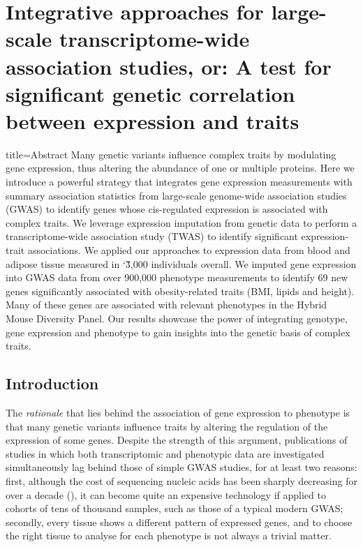 \documentclass[../main.tex]{subfiles}
\begin{document}
\chapter{Integrative approaches for large-scale transcriptome-wide 
association studies, or: A test for significant \cis genetic correlation 
between expression and traits}

\begin{external_abstract}{title=Abstract}
Many genetic variants influence complex traits by modulating gene 
expression, thus altering the abundance of one or multiple proteins. 
Here we introduce a powerful strategy that integrates gene expression 
measurements with summary association statistics from large-scale 
genome-wide association studies (GWAS) to identify genes whose 
cis-regulated expression is associated with complex traits. We leverage 
expression imputation from genetic data to perform a transcriptome-wide 
association study (TWAS) to identify significant expression-trait 
associations. We applied our approaches to expression data from blood 
and adipose tissue measured in \char`\~3,000 individuals overall. We 
imputed gene expression into GWAS data from over 900,000 phenotype 
measurements to identify 69 new genes significantly associated with 
obesity-related traits (BMI, lipids and height). Many of these genes are 
associated with relevant phenotypes in the Hybrid Mouse Diversity Panel. 
Our results showcase the power of integrating genotype, gene expression 
and phenotype to gain insights into the genetic basis of complex traits.
\end{external_abstract}

\section{Introduction}

The \textit{rationale} that lies behind the association of gene 
expression to phenotype is that many genetic variants influence traits 
by altering the regulation of the expression of some genes. Despite the 
strength of this argument, publications of studies in which both 
transcriptomic and phenotypic data are investigated simultaneously lag 
behind those of simple GWAS studies, for at least two reasons: first, 
although the cost of sequencing nucleic acids has been sharply 
decreasing for over a decade (), it can become 
quite an expensive technology if applied to cohorts of tens of thousand 
samples, such as those of a typical modern GWAS; secondly, every tissue 
shows a different pattern of expressed genes, and to choose the right 
tissue to analyse for each phenotype is not always a trivial matter.
\end{document}
